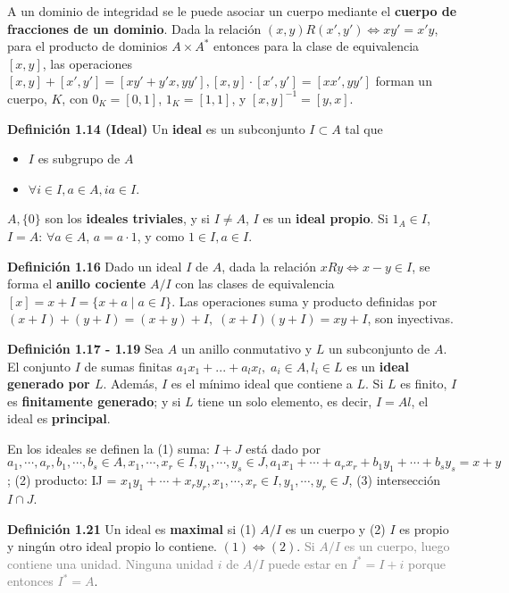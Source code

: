 \documentclass[a4paper, 11pt]{extarticle}
\newcommand{\defi}[1]{\textcolor{azul}{\textbf{Definición #1}}}
\begin{document}
A un dominio de integridad se le puede asociar un cuerpo mediante el \textbf{cuerpo de
fracciones de un dominio}. 
Dada la relación \((x,y) R (x', y') \iff xy' = x'y\), para el producto de dominios \(A \times  A^*\) 
entonces para la clase de equivalencia \([x,y]\), las operaciones \([x,y] +
[x', y'] = [xy' + y'x, yy'], [x,y]\cdot [x',y'] = [xx', yy']\) forman un
cuerpo, \(K\), con \(0_K = [0, 1]\), \(1_K = [1,1]\), y \([x,y] ^{-1} =
 [y, x]\).

\defi{1.14 (Ideal)} Un \textbf{ideal} es un subconjunto \(I \subset A\) tal que \vspace{-1em}
\begin{itemize}
\item \(I\) es subgrupo de \(A\)
\item \(\forall i \in I, a \in A, ia \in I\).
\end{itemize}
\(A, \{ 0 \}\) son los \textbf{ideales triviales}, y si \(I \neq A\), \(I\) es un  
\textbf{ideal propio}. Si \(1_A \in I\), \(I = A\): \(\forall a \in A\), \(a = a
\cdot 1\), y como \(1 \in I, a \in I\).

\defi{1.16} Dado un ideal \(I\) de \(A\), dada la relación \(xRy \iff x-y
\in I\), se forma el \textbf{anillo cociente} \(A/I\) con las clases de equivalencia
\([x] = x + I = \{ x + a \;|\; a \in I  \}\).
Las operaciones suma y producto definidas por \((x + I) + (y + I) = (x + y) +
I, \; (x + I)(y + I) = xy + I\), son inyectivas.

\defi{1.17 - 1.19} Sea \(A\) un anillo conmutativo y \(L\) un subconjunto de \(A\). El conjunto \(I\) de sumas finitas \(a_1x_1 + ... + a_lx_l,\; a_i \in A,
l_i \in L\) es un \textbf{ideal generado por \(L\)}. Además, \(I\) es el mínimo 
ideal que contiene a \(L\). Si \(L\) es finito, \(I\) es \textbf{finitamente generado}; y si \(L\) tiene
un solo elemento, es decir, \(I = Al\), el ideal es \textbf{principal}.

En los ideales se definen la (1) suma: \(I + J\) está dado por \(a_1, \cdots,
a_r, b_1, \cdots, b_s \in A, x_1, \cdots, x_r \in I, y_1, \cdots, y_s \in J,
a_1x_1 + \cdots + a_rx_r + b_1y_1 + \cdots + b_sy_s = x + y\); (2) producto: IJ
= \(x_1y_1 + \cdots + x_ry_r, x_1, \cdots, x_r \in I, y_1, \cdots, y_r \in J\), (3) intersección \(I \cap J\).

\defi{1.21} Un ideal es \textbf{maximal} si (1) \(A/I\) es un cuerpo y (2) \(I\) es
propio y ningún otro ideal propio lo contiene. \((1) \iff (2)\).
\textcolor{gray}{\footnotesize Si \( A/I  \) es
un cuerpo, luego contiene una unidad. Ninguna unidad \( i \) de \( A/I  \) puede estar
en \( I^* = I + i \) porque entonces \( I^* = A \)}.
\end{document}
